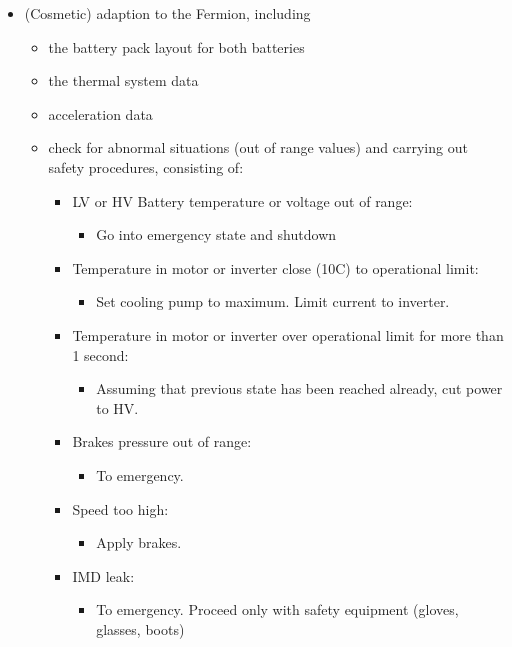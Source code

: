 \begin{itemize}
    \item (Cosmetic) adaption to the Fermion, including \begin{itemize}
        \item the battery pack layout for both batteries
        \item the thermal system data
        \item acceleration data
        \item check for abnormal situations (out of range values) and carrying out safety procedures, consisting of:
        \begin{itemize}
            \item LV or HV Battery temperature or voltage out of range:
            \begin{itemize}
                \item Go into emergency state and shutdown
            \end{itemize}
            \item Temperature in motor or inverter close (10C) to operational limit:
            \begin{itemize}
                \item Set cooling pump to maximum. Limit current to inverter.
            \end{itemize}
            \item Temperature in motor or inverter over operational limit for more than 1 second:
            \begin{itemize}
                \item Assuming that previous state has been reached already, cut power to HV.
            \end{itemize}
            \item Brakes pressure out of range:
            \begin{itemize}
                \item To emergency.
            \end{itemize}
            \item Speed too high:
            \begin{itemize}
                \item Apply brakes.
            \end{itemize}
            \item IMD leak:
            \begin{itemize}
                \item To emergency. Proceed only with safety equipment (gloves, glasses, boots)

\end{itemize}
\end{itemize}
\end{itemize}
\end{itemize}
